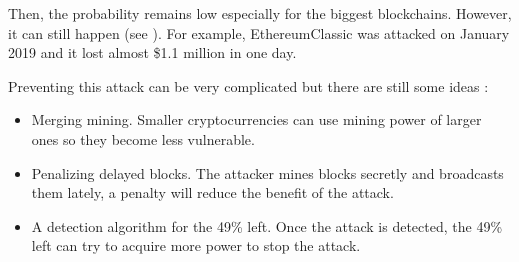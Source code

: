 Then, the probability remains low especially for the biggest blockchains. However, it can still happen (see \cite{blockchains_51_attack}). For example, EthereumClassic was attacked on January 2019 and it lost almost \$1.1 million in one day.

Preventing this attack can be very complicated but there are still some ideas :

\begin{itemize}
  \item Merging mining. Smaller cryptocurrencies can use mining power of larger ones so they become less vulnerable.
  \item Penalizing delayed blocks. The attacker mines blocks secretly and broadcasts them lately, a penalty will reduce the benefit of the attack.
  \item A detection algorithm for the 49\% left. Once the attack is detected, the 49\% left can try to acquire more power to stop the attack.
\end{itemize}
